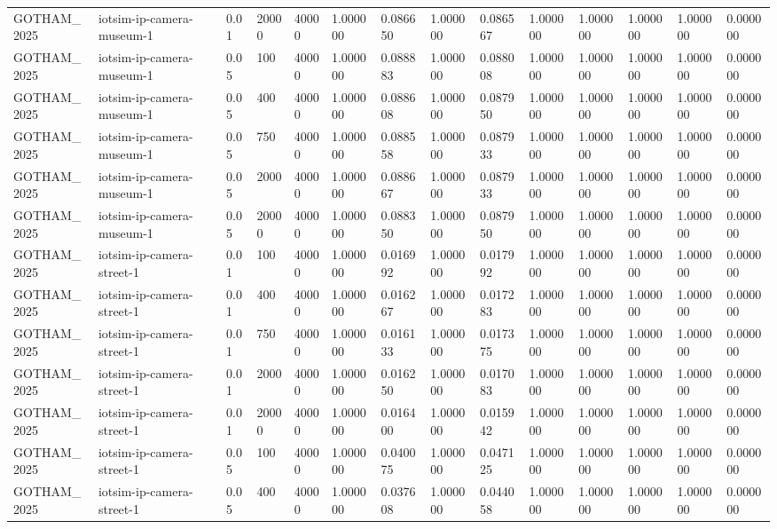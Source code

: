 \begin{tabular}{llllllllllllll}
GOTHAM\_2025 & iotsim-ip-camera-museum-1 & 0.01 & 20000 & 40000 & 1.000000 & 0.086650 & 1.000000 & 0.086567 & 1.000000 & 1.000000 & 1.000000 & 1.000000 & 0.000000 \\
GOTHAM\_2025 & iotsim-ip-camera-museum-1 & 0.05 & 100 & 40000 & 1.000000 & 0.088883 & 1.000000 & 0.088008 & 1.000000 & 1.000000 & 1.000000 & 1.000000 & 0.000000 \\
GOTHAM\_2025 & iotsim-ip-camera-museum-1 & 0.05 & 400 & 40000 & 1.000000 & 0.088608 & 1.000000 & 0.087950 & 1.000000 & 1.000000 & 1.000000 & 1.000000 & 0.000000 \\
GOTHAM\_2025 & iotsim-ip-camera-museum-1 & 0.05 & 750 & 40000 & 1.000000 & 0.088558 & 1.000000 & 0.087933 & 1.000000 & 1.000000 & 1.000000 & 1.000000 & 0.000000 \\
GOTHAM\_2025 & iotsim-ip-camera-museum-1 & 0.05 & 2000 & 40000 & 1.000000 & 0.088667 & 1.000000 & 0.087933 & 1.000000 & 1.000000 & 1.000000 & 1.000000 & 0.000000 \\
GOTHAM\_2025 & iotsim-ip-camera-museum-1 & 0.05 & 20000 & 40000 & 1.000000 & 0.088350 & 1.000000 & 0.087950 & 1.000000 & 1.000000 & 1.000000 & 1.000000 & 0.000000 \\
GOTHAM\_2025 & iotsim-ip-camera-street-1 & 0.01 & 100 & 40000 & 1.000000 & 0.016992 & 1.000000 & 0.017992 & 1.000000 & 1.000000 & 1.000000 & 1.000000 & 0.000000 \\
GOTHAM\_2025 & iotsim-ip-camera-street-1 & 0.01 & 400 & 40000 & 1.000000 & 0.016267 & 1.000000 & 0.017283 & 1.000000 & 1.000000 & 1.000000 & 1.000000 & 0.000000 \\
GOTHAM\_2025 & iotsim-ip-camera-street-1 & 0.01 & 750 & 40000 & 1.000000 & 0.016133 & 1.000000 & 0.017375 & 1.000000 & 1.000000 & 1.000000 & 1.000000 & 0.000000 \\
GOTHAM\_2025 & iotsim-ip-camera-street-1 & 0.01 & 2000 & 40000 & 1.000000 & 0.016250 & 1.000000 & 0.017083 & 1.000000 & 1.000000 & 1.000000 & 1.000000 & 0.000000 \\
GOTHAM\_2025 & iotsim-ip-camera-street-1 & 0.01 & 20000 & 40000 & 1.000000 & 0.016400 & 1.000000 & 0.015942 & 1.000000 & 1.000000 & 1.000000 & 1.000000 & 0.000000 \\
GOTHAM\_2025 & iotsim-ip-camera-street-1 & 0.05 & 100 & 40000 & 1.000000 & 0.040075 & 1.000000 & 0.047125 & 1.000000 & 1.000000 & 1.000000 & 1.000000 & 0.000000 \\
GOTHAM\_2025 & iotsim-ip-camera-street-1 & 0.05 & 400 & 40000 & 1.000000 & 0.037608 & 1.000000 & 0.044058 & 1.000000 & 1.000000 & 1.000000 & 1.000000 & 0.000000 \\

\end{tabular}
